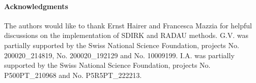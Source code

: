 \documentclass[10pt,a4paper]{article}
\begin{document}
\paragraph{Acknowledgments} 
The authors would like to thank Ernst Hairer and Francesca Mazzia for helpful discussions on the implementation of SDIRK and RADAU methods. G.V. was partially supported by the Swiss National Science
Foundation, projects No. 200020\_214819, No. 200020\_192129 and No. 10009199. I.A. was partially supported by the Swiss National Science Foundation, projects No. P500PT\_210968 and No. P5R5PT\_222213.


   
	


\appendix
\end{document}
